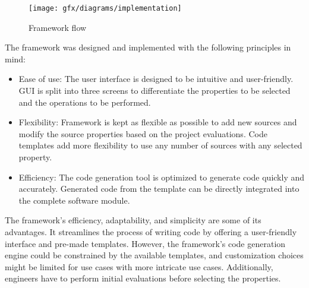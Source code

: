\begin{figure}[!h]
	\centering
	\texttt{[image: gfx/diagrams/implementation]}
	\caption{Framework flow}
	\label{fig:5:1}
\end{figure}

The framework was designed and implemented with the following
principles in mind:
\begin{itemize}
	\item Ease of use: The user interface is designed to be intuitive and user-friendly. GUI is split into three screens to differentiate the properties to be selected and the operations to be performed.
	
	\item Flexibility: Framework is kept as flexible as possible to add new sources and modify the source properties based on the project evaluations. Code templates add more flexibility to use any number of sources with any selected property.
	
	\item Efficiency: The code generation tool is optimized to generate code quickly and accurately. Generated code from the template can be directly integrated into the complete software module.
\end{itemize}

The framework’s efficiency, adaptability, and simplicity are some of its advantages. It streamlines the process of writing code by offering a user-friendly interface and pre-made templates. However, the framework’s code generation engine could be constrained by the available templates, and customization choices might be limited for use cases with more intricate use cases. Additionally, engineers have to perform initial evaluations before selecting the properties.


%
%
